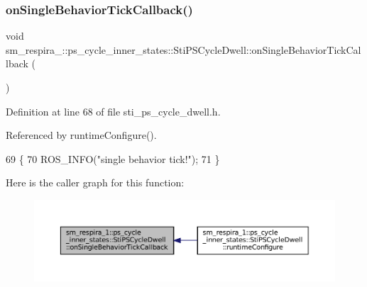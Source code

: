 \subsubsection{\texorpdfstring{on\+Single\+Behavior\+Tick\+Callback()}{onSingleBehaviorTickCallback()}}
{\footnotesize\ttfamily void sm\+\_\+respira\+\_\+::ps\+\_\+cycle\+\_\+inner\+\_\+states\+::\+Sti\+P\+S\+Cycle\+Dwell\+::on\+Single\+Behavior\+Tick\+Callback (\begin{DoxyParamCaption}{ }\end{DoxyParamCaption})\hspace{0.3cm}{\ttfamily [inline]}}



Definition at line 68 of file sti\+\_\+ps\+\_\+cycle\+\_\+dwell.\+h.



Referenced by runtime\+Configure().


\begin{DoxyCode}
69   \{
70     ROS\_INFO(\textcolor{stringliteral}{"single behavior tick!"});
71   \}
\end{DoxyCode}
Here is the caller graph for this function\+:
\nopagebreak
\begin{figure}[H]
\begin{center}
\leavevmode
\includegraphics[width=350pt]{structsm__respira__1_1_1ps__cycle__inner__states_1_1StiPSCycleDwell_a0e949b981066fe796ddb15fd7875056a_icgraph}
\end{center}
\end{figure}
\mbox{\label{structsm__respira__1_1_1ps__cycle__inner__states_1_1StiPSCycleDwell_a01112c5545a2fcf9bf83057eb2748f73}} 
